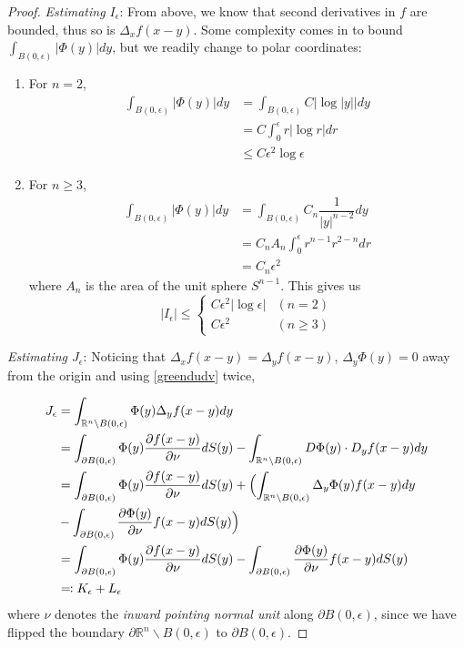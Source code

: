 \documentclass[openany, amssymb, psamsfonts]{amsart}
\theoremstyle{definition}
\numberwithin{equation}{section}
\newcommand{\bbr}{\mathbb{R}}
\begin{document}
\begin{proof}
    \textit{Estimating $I_\epsilon$}: From above, we know that second derivatives in $f$ are bounded, thus so is $\Delta_x f(x - y)$. Some complexity comes in to bound $\int_{B(0, \epsilon)} |\Phi(y)| dy$, but we readily change to polar coordinates:
    \begin{enumerate}
        \item For $n=2$,
        \begin{align*}
            \int_{B(0, \epsilon)} |\Phi(y)| dy &= \int_{B(0, \epsilon)} C |\log |y||dy \\
            &= C \int_{0}^{\epsilon} r |\log r| dr \\
            &\leq C \epsilon^2 \log \epsilon
        \end{align*}
        \item For $n \geq 3$, 
\begin{align*}
    \int_{B(0, \epsilon)} |\Phi(y)| dy &= \int_{B(0, \epsilon)} C_n \dfrac{1}{|y|^{n-2}} dy \\
            &= C_n A_n \int_{0}^{\epsilon} r^{n-1} r^{2-n} dr \\
            &= C_n \epsilon^2
\end{align*}
where $A_n$ is the area of the unit sphere $S^{n-1}$. This gives us \begin{equation} \label{I_e}
    |I_\epsilon| \leq \begin{cases}
        C\epsilon^2 |\log \epsilon| & (n=2) \\
        C \epsilon^2 & (n \geq 3)
    \end{cases}
\end{equation}
\end{enumerate}

\textit{Estimating $J_\epsilon$}: Noticing that $\Delta_x f(x-y) = \Delta_y f(x-y)$, $\Delta_y \Phi(y) = 0$ away from the origin and using \eqref{greendudv} twice,

\begin{align*}
    J_\epsilon &= \int_{\bbr^n \backslash B(0, \epsilon)} \Phi(y) \Delta_y f(x - y)dy \\
    &= \int_{\partial B(0, \epsilon)} \Phi(y) \dfrac{\partial f(x - y)}{\partial \nu} dS(y)  - \int_{\bbr^n \backslash B(0, \epsilon)} D\Phi(y) \cdot D_y f(x - y)dy \\
    &= \int_{\partial B(0, \epsilon)} \Phi(y) \dfrac{\partial f(x - y)}{\partial \nu} dS(y) + \Bigl(\int_{\bbr^n \backslash B(0, \epsilon)} \Delta_y \Phi(y) f(x - y)dy \\
    & - \int_{\partial B(0, \epsilon)} \dfrac{\partial \Phi(y)}{\partial \nu} f(x - y) dS(y) \Bigr) \\
    & = \int_{\partial B(0, \epsilon)} \Phi(y) \dfrac{\partial f(x - y)}{\partial \nu} dS(y) - \int_{\partial B(0, \epsilon)} \dfrac{\partial \Phi(y)}{\partial \nu} f(x - y) dS(y) \\
    & \eqqcolon K_\epsilon + L_\epsilon
\end{align*}
where $\nu$ denotes the \textit{inward pointing normal unit} along $\partial B(0, \epsilon)$, since we have flipped the boundary $\partial \bbr^n \backslash B(0, \epsilon)$ to $\partial B(0, \epsilon)$.


\end{proof}
\end{document}
